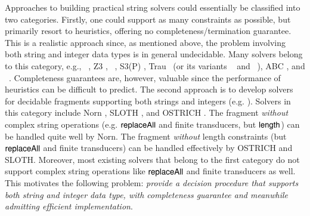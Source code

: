 Approaches to building practical string solvers could essentially be classified
into two categories. Firstly, one could support as many constraints as possible, but 
primarily resort to heuristics, 
offering no completeness/termination guarantee. This is a realistic approach 
since, as
mentioned above, the problem involving both string and integer data types is in 
general undecidable. Many solvers
belong to this category, e.g., 
{\cvc}~\cite{cvc4}, Z3 \cite{BTV09,Z3}, {\zthree}~\cite{Z3-str3}, S3(P) \cite{S3,TCJ16},
Trau~\cite{Abdulla17} (or its variants {\trauplus}~\cite{AbdullaA+19} and {\zthreetrau}~\cite{Z3-trau}), ABC \cite{ABC}, and \slent~\cite{WC+18}.
%
%
Completeness guarantees are, however, valuable since %
the 
performance of heuristics can be difficult to predict.
The second approach is to develop solvers for decidable fragments
supporting both strings and integers (e.g. %
\cite{Vijay-length,BFL13,Abdulla14,AbdullaA+19,LB16,CCH+18,CHL+19,HJLRV18}). 
Solvers in this category include Norn \cite{Abdulla14}, SLOTH
\cite{HJLRV18}, and OSTRICH \cite{CHL+19}. 
The fragment \emph{without} complex string operations (e.g. $\mathsf{replaceAll}$ and
finite transducers, but $\mathsf{length}$) can be handled quite well by Norn. The fragment \emph{without} length
constraints (but $\mathsf{replaceAll}$ and finite transducers)
can be handled effectively by OSTRICH and SLOTH. 
Moreover, most existing solvers that belong to the first category do not support
complex string operations like $\mathsf{replaceAll}$ and finite transducers as well.
This motivates the following problem: 
\emph{provide a decision procedure that supports both string and integer data type, with completeness guarantee and meanwhile admitting efficient implementation}.

